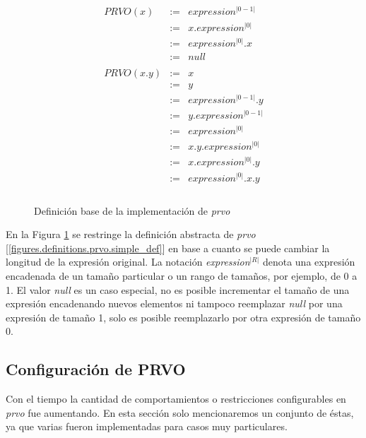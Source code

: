 \begin{figure}
	\begin{displaymath}
	\begin{array}{lll}
  PRVO(x)		& :=	& expression^{|0-1|} \\
  & := & x.expression^{|0|} \\
  & := & expression^{|0|}.x \\
  & := & null \\
	
  \\
  PRVO(x.y)	& :=	& x \\
  & :=	& 	y \\
  & :=	& expression^{|0-1|}.y \\
  & :=	& y.expression^{|0-1|} \\
  & :=	& expression^{|0|} \\
  & :=	& x.y.expression^{|0|} \\
  & :=	& x.expression^{|0|}.y \\
  & :=	& expression^{|0|}.x.y \\
  \\
	
	\end{array}
	\end{displaymath}
	\caption{Definici\'on base de la implementaci\'on de \emph{prvo}}
	\label{figures.definitions.prvo.impl_def}
\end{figure}

En la Figura \ref{figures.definitions.prvo.impl_def} se restringe la definici\'on abstracta de \emph{prvo} [\ref{figures.definitions.prvo.simple_def}] en base a cuanto se puede cambiar la longitud de la expresi\'on original. La notaci\'on \emph{expression$^{|R|}$} denota una expresi\'on encadenada de un tama\~no particular o un rango de tama\~nos, por ejemplo, de 0 a 1. El valor \emph{null} es un caso especial, no es posible incrementar el tama\~no de una expresi\'on encadenando nuevos elementos ni tampoco reemplazar \emph{null} por una expresi\'on de tama\~no 1, solo es posible reemplazarlo por otra expresi\'on de tama\~no 0.

\subsection{Configuraci\'on de PRVO}

Con el tiempo la cantidad de comportamientos o restricciones configurables en \emph{prvo} fue aumentando. En esta secci\'on solo mencionaremos un conjunto de \'estas, ya que varias fueron implementadas para casos muy particulares.


